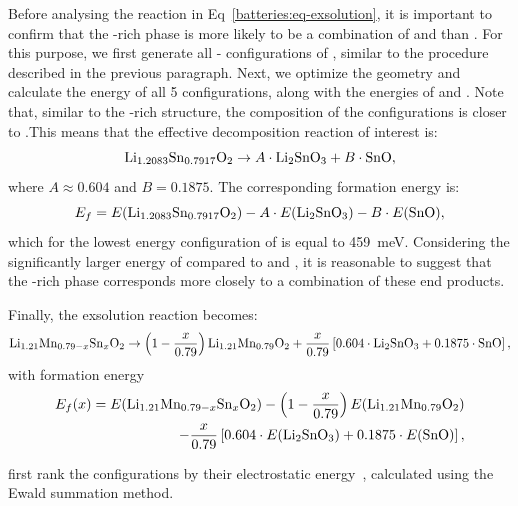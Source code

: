 \begin{refsection}
Before analysing the reaction in Eq~\ref{batteries:eq-exsolution}, it is 
important to confirm that the -rich phase is more likely to be a 
combination of  and  than . For 
this purpose, we first generate all - configurations of 
, similar to the procedure described in the previous 
paragraph. Next, we optimize the geometry and calculate the energy of all 5 
configurations, along with the energies of  and . Note 
that, similar to the -rich  structure, the composition of the 
configurations is closer to .This means that the 
effective decomposition reaction of interest is: 
\begin{equation} \label{batteries:eq-Sn-decomposition} 
\ce{Li_{1.2083}Sn_{0.7917}O2} \rightarrow  A  \cdot \ce{Li2SnO3} + B \cdot 
\ce{SnO}, 
\end{equation} 
where $A \approx 0.604$ and $B = 0.1875$. The corresponding formation energy 
is: 
\begin{equation} 
E_f = E(\ce{Li_{1.2083}Sn_{0.7917}O2}) - A \cdot E(\ce{Li2SnO3}) - B \cdot 
E(\ce{SnO}), 
\end{equation} 
which for the lowest energy configuration of  is 
equal to 459~\si{\milli\electronvolt}. Considering the significantly larger 
energy of  compared to  and , 
it is reasonable to suggest that the -rich phase corresponds more 
closely to a combination of these end products. 
 
Finally, the exsolution reaction becomes: 
\begin{equation} \label{batteries:eq-exsolution_final} 
 \ce{Li_{1.21}Mn_{0.79-x}Sn_xO2} \rightarrow  \left( 1 - \frac{x}{0.79} 
\right) \ce{Li_{1.21}Mn_{0.79}O2} +  \frac{x}{0.79} \left[  0.604 \cdot 
\ce{Li2SnO3} + 0.1875 \cdot \ce{SnO} \right], 
\end{equation} 
with formation energy 
\begin{align} \label{batteries:eq-exsolution_final_formation} 
 E_f(x) = E(\ce{Li_{1.21}Mn_{0.79-x}Sn_xO2}) -  \left( 1 - \frac{x}{0.79} 
\right) E(\ce{Li_{1.21}Mn_{0.79}O2}) \\ -  \frac{x}{0.79} \left[  0.604 \cdot 
E(\ce{Li2SnO3}) + 0.1875 \cdot E(\ce{SnO}) \right], 
\end{align} 
 
first rank the configurations by their electrostatic energy~\cite{Seo2016}, 
calculated using the Ewald summation method. 
 

\end{refsection}
